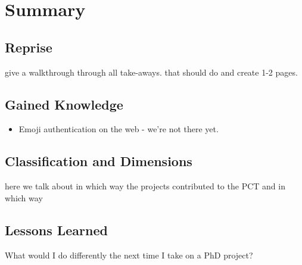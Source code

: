 \chapter[Summary]{Summary}\label{chap:summary}

\section{Reprise} %
give a walkthrough through all take-aways. that should do and create 1-2 pages. 

\section{Gained Knowledge}
\begin{itemize}
\item Emoji authentication on the web - we're not there yet. 
\end{itemize}

\section{Classification and Dimensions}
here we talk about in which way the projects contributed to the PCT and in which way





\section{Lessons Learned}
What would I do differently the next time I take on a PhD project?



